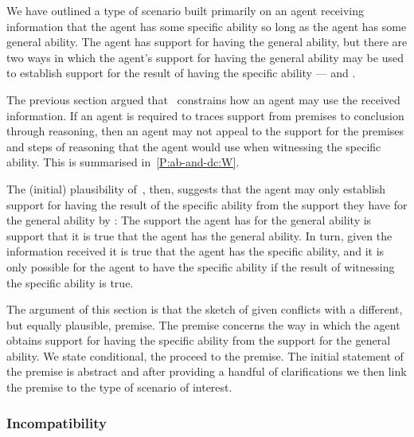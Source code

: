 \hozline{}

\begin{note}
  We have outlined a type of scenario built primarily on an agent receiving information that the agent has some specific ability so long as the agent has some general ability.
  The agent has support for having the general ability, but there are two ways in which the agent's support for having the general ability may be used to establish support for {\color{red} the result of having the specific ability} --- \AR{} and \WR{}.

  The previous section argued that~\ESU{} constrains how an agent may use the received information.
  If an agent is required to traces support from premises to conclusion through reasoning, then an agent may not appeal to the support for the premises and steps of reasoning that the agent would use when witnessing the specific ability.
  {\color{red} This is summarised in~\ref{P:ab-and-dc:W}.}

  The (initial) plausibility of~\ESU{}, then, suggests that the agent may only establish support for having the {\color{red} result of the specific ability} from the support they have for the general ability by \AR{}:
  The support the agent has for the general ability is support that it is true that the agent has the general ability.
  In turn, given the information received it is true that the agent has the specific ability, and it is only possible for the agent to have the specific ability if the result of witnessing the specific ability is true.

  The argument of this section is that the sketch of \AR{} given conflicts with a different, but equally plausible, premise.
  The premise concerns the way in which the agent obtains support for having the specific ability from the support for the general ability.
  We state conditional, the proceed to the premise.
  The initial statement of the premise is abstract and after providing a handful of clarifications we then link the premise to the type of scenario of interest.
\end{note}

\subsubsection{Incompatibility}
\label{sec:ni-summary}

